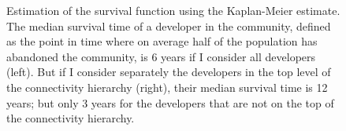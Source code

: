 \begin{figure}[H]
\centering
{}
\hspace{.01in}
\label{fig:survival}
\caption[Survival function using the Kaplan-Meier estimate.]{Estimation of the survival function using the Kaplan-Meier estimate. The median survival time of a developer in the community, defined as the point in time where on average half of the population has abandoned the community, is 6 years if I consider all developers (left). But if I consider separately the developers in the top level of the connectivity hierarchy (right), their median survival time is 12 years; but only 3 years for the developers that are not on the top of the connectivity hierarchy.}
\end{figure}

